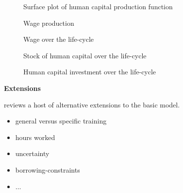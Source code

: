 \begin{frame}\begin{figure}[htp]\centering
\caption{Surface plot of human capital production function}
\end{figure}\end{frame}

\begin{frame}\begin{figure}[htp]\centering
\caption{Wage production}
\end{figure}\end{frame}

\begin{frame}\begin{figure}[htp]\centering
\caption{Wage over the life-cycle}
\end{figure}\end{frame}

\begin{frame}\begin{figure}[htp]\centering
\caption{Stock of human capital over the life-cycle}
\end{figure}\end{frame}

\begin{frame}\begin{figure}[htp]\centering
\caption{Human capital investment over the life-cycle}
\end{figure}\end{frame}
\begin{frame}\textbf{Extensions}\vspace{0.3cm}

 reviews a host of alternative extensions to the basic model.\\

\begin{itemize}\setlength\itemsep{1em}
\item general versus specific training
\item hours worked
\item uncertainty
\item borrowing-constraints
\item $\hdots$
\end{itemize}

\end{frame}
